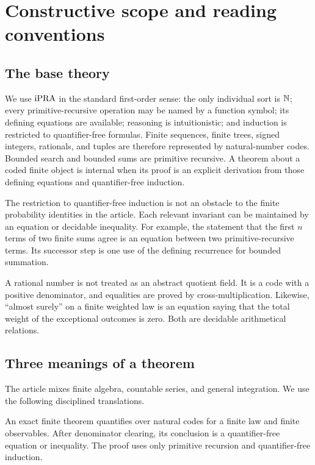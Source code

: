 \section{Constructive scope and reading conventions}\label{sec:scope}

\subsection{The base theory}

We use \(\mathrm{iPRA}\) in the standard first-order sense: the only individual sort is
\(\mathbb N\); every primitive-recursive operation may be named by a function symbol;
its defining equations are available; reasoning is intuitionistic; and
induction is restricted to quantifier-free formulas.  Finite sequences,
finite trees, signed integers, rationals, and tuples are therefore represented
by natural-number codes.  Bounded search and bounded sums are primitive
recursive.  A theorem about a coded finite object is internal when its proof is
an explicit derivation from those defining equations and quantifier-free
induction.

The restriction to quantifier-free induction is not an obstacle to the finite
probability identities in the article.  Each relevant invariant can be
maintained by an equation or decidable inequality.  For example, the statement
that the first \(n\) terms of two finite sums agree is an equation between two
primitive-recursive terms.  Its successor step is one use of the defining
recurrence for bounded summation.

\begin{remark}
A rational number is not treated as an abstract quotient field.  It is a code
with a positive denominator, and equalities are proved by
cross-multiplication.  Likewise, ``almost surely'' on a finite weighted law is
an equation saying that the total weight of the exceptional outcomes is zero.
Both are decidable arithmetical relations.
\end{remark}

\subsection{Three meanings of a theorem}

The article mixes finite algebra, countable series, and general integration.
We use the following disciplined translations.

\begin{definition}
An exact finite theorem quantifies over natural codes for a finite law and
finite observables.  After denominator clearing, its conclusion is a
quantifier-free equation or inequality.  The proof uses only primitive
recursion and quantifier-free induction.
\end{definition}

